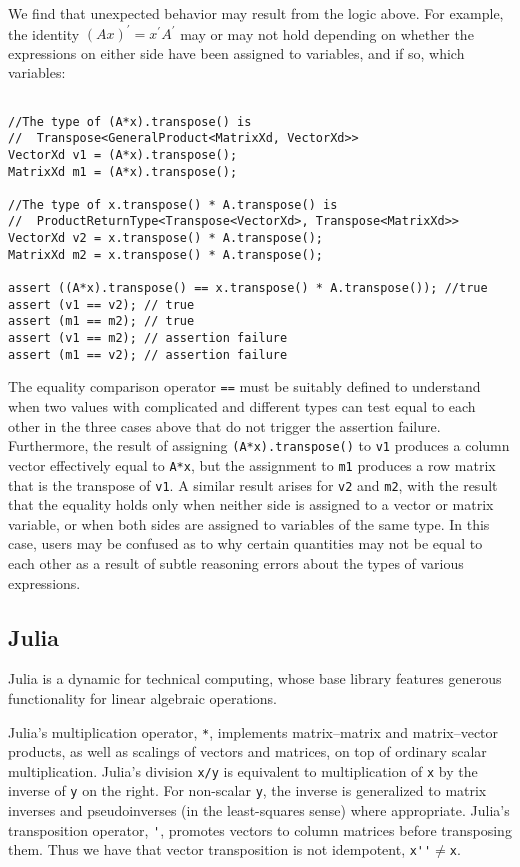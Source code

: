 We find that unexpected behavior may result from the logic above. For example,
the identity ${(Ax)}^\prime = x^\prime A^\prime$ may or may not hold depending on
whether the expressions on either side have been assigned to variables, and if
so, which variables:
%
\begin{verbatim}

//The type of (A*x).transpose() is
//  Transpose<GeneralProduct<MatrixXd, VectorXd>>
VectorXd v1 = (A*x).transpose();
MatrixXd m1 = (A*x).transpose();

//The type of x.transpose() * A.transpose() is
//  ProductReturnType<Transpose<VectorXd>, Transpose<MatrixXd>>
VectorXd v2 = x.transpose() * A.transpose();
MatrixXd m2 = x.transpose() * A.transpose();

assert ((A*x).transpose() == x.transpose() * A.transpose()); //true
assert (v1 == v2); // true
assert (m1 == m2); // true
assert (v1 == m2); // assertion failure
assert (m1 == v2); // assertion failure

\end{verbatim}
%
The equality comparison operator \verb`==` must be suitably defined to
understand when two values with complicated and different types can test equal
to each other in the three cases above that do not trigger the assertion
failure. Furthermore, the result of assigning \verb`(A*x).transpose()` to
\verb`v1` produces a column vector effectively equal to \verb`A*x`, but the
assignment to \verb`m1` produces a row matrix that is the transpose of
\verb`v1`.
A similar result arises for \verb`v2` and \verb`m2`, with the result that the
equality holds only when neither side is assigned to a vector or matrix
variable, or when both sides are assigned to variables of the same type. In
this case, users may be confused as to why certain quantities may not be equal
to each other as a result of subtle reasoning errors about the types of various
expressions.


\subsection{Julia}

Julia is a dynamic for technical computing, whose base library features
generous functionality for linear algebraic operations.~\cite{Bezanson2012}

Julia's multiplication operator, \verb`*`, implements matrix--matrix and
matrix--vector products, as well as scalings of vectors and matrices, on top of
ordinary scalar multiplication.
Julia's division \verb`x/y` is equivalent to multiplication of \verb`x` by the
inverse of \verb`y` on the right. For non-scalar \verb`y`, the inverse is
generalized to matrix inverses and pseudoinverses (in the least-squares sense)
where appropriate.
Julia's transposition operator, \verb`'`, promotes vectors to column matrices
before transposing them. Thus we have that vector transposition is not
idempotent, \verb`x''`$\ne$\verb`x`.

